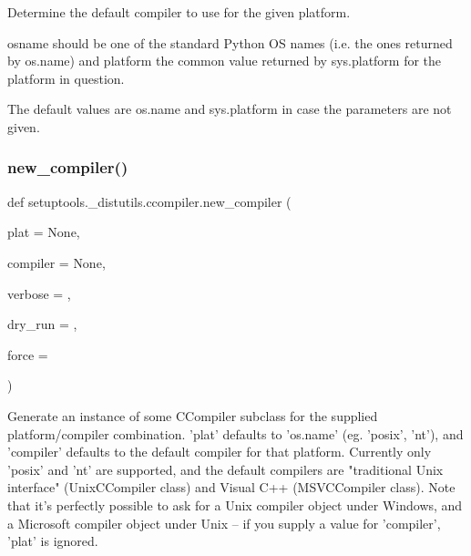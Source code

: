 \begin{DoxyVerb}Determine the default compiler to use for the given platform.

   osname should be one of the standard Python OS names (i.e. the
   ones returned by os.name) and platform the common value
   returned by sys.platform for the platform in question.

   The default values are os.name and sys.platform in case the
   parameters are not given.
\end{DoxyVerb}
 \mbox{\label{namespacesetuptools_1_1__distutils_1_1ccompiler_aa33975550d1aae55411abeb711b8f7fb}} 
\subsubsection{\texorpdfstring{new\+\_\+compiler()}{new\_compiler()}}
{\footnotesize\ttfamily def setuptools.\+\_\+distutils.\+ccompiler.\+new\+\_\+compiler (\begin{DoxyParamCaption}\item[{}]{plat = {\ttfamily None},  }\item[{}]{compiler = {\ttfamily None},  }\item[{}]{verbose = {},  }\item[{}]{dry\+\_\+run = {},  }\item[{}]{force = {} }\end{DoxyParamCaption})}

\begin{DoxyVerb}Generate an instance of some CCompiler subclass for the supplied
platform/compiler combination.  'plat' defaults to 'os.name'
(eg. 'posix', 'nt'), and 'compiler' defaults to the default compiler
for that platform.  Currently only 'posix' and 'nt' are supported, and
the default compilers are "traditional Unix interface" (UnixCCompiler
class) and Visual C++ (MSVCCompiler class).  Note that it's perfectly
possible to ask for a Unix compiler object under Windows, and a
Microsoft compiler object under Unix -- if you supply a value for
'compiler', 'plat' is ignored.
\end{DoxyVerb}
 \mbox{\label{namespacesetuptools_1_1__distutils_1_1ccompiler_a764b086d07417c6b316bc8d81f9bf897}} 
